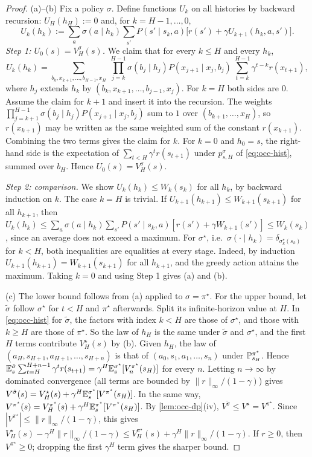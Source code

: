 \begin{proof}
(a)--(b) Fix a policy $\sigma$. Define functions $U_k$ on all histories by backward recursion: $U_H(h_H):=0$ and, for $k=H-1,\dots,0$,
\[
U_k(h_k):=\sum_a\sigma(a\mid h_k)\sum_{s'}P(s'\mid s_k,a)\big[r(s')+\gamma U_{k+1}(h_k,a,s')\big].
\]
\emph{Step 1: $U_0(s)=V^\sigma_H(s)$.} We claim that for every $k\le H$ and every $h_k$,
\[
U_k(h_k)=\sum_{b_k,x_{k+1},\dots,b_{H-1},x_H}\ \prod_{j=k}^{H-1}\sigma(b_j\mid h_j)P(x_{j+1}\mid x_j,b_j)\ \sum_{t=k}^{H-1}\gamma^{t-k}r(x_{t+1}),
\]
where $h_j$ extends $h_k$ by $(b_k,x_{k+1},\dots,b_{j-1},x_j)$.
For $k=H$ both sides are $0$.
Assume the claim for $k+1$ and insert it into the recursion.
The weights $\prod_{j=k+1}^{H-1}\sigma(b_j\mid h_j)P(x_{j+1}\mid x_j,b_j)$ sum to $1$ over $(b_{k+1},\dots,x_H)$, so $r(x_{k+1})$ may be written as the same weighted sum of the constant $r(x_{k+1})$.
Combining the two terms gives the claim for $k$.
For $k=0$ and $h_0=s$, the right-hand side is the expectation of $\sum_{t<H}\gamma^tr(s_{t+1})$ under $p^\sigma_{s,H}$ of \eqref{eq:occ-hist}, summed over $b_H$.
Hence $U_0(s)=V^\sigma_H(s)$.

\emph{Step 2: comparison.} We show $U_k(h_k)\le W_k(s_k)$ for all $h_k$, by backward induction on $k$.
The case $k=H$ is trivial.
If $U_{k+1}(h_{k+1})\le W_{k+1}(s_{k+1})$ for all $h_{k+1}$, then
$U_k(h_k)\le\sum_a\sigma(a\mid h_k)\sum_{s'}P(s'\mid s_k,a)[r(s')+\gamma W_{k+1}(s')]\le W_k(s_k)$,
since an average does not exceed a maximum.
For $\sigma^\star$, i.e.\ $\sigma(\cdot\mid h_k)=\delta_{\sigma^\star_k(s_k)}$ for $k<H$, both inequalities are equalities at every stage.
Indeed, by induction $U_{k+1}(h_{k+1})=W_{k+1}(s_{k+1})$ for all $h_{k+1}$, and the greedy action attains the maximum.
Taking $k=0$ and using Step 1 gives (a) and (b).

(c) The lower bound follows from (a) applied to $\sigma=\pi^\star$.
For the upper bound, let $\tilde\sigma$ follow $\sigma^\star$ for $t<H$ and $\pi^\star$ afterwards.
Split its infinite-horizon value at $H$.
In \eqref{eq:occ-hist} for $\tilde\sigma$, the factors with index $k<H$ are those of $\sigma^\star$, and those with $k\ge H$ are those of $\pi^\star$.
So the law of $h_H$ is the same under $\tilde\sigma$ and $\sigma^\star$, and the first $H$ terms contribute $V^\star_H(s)$ by (b).
Given $h_H$, the law of $(a_H,s_{H+1},a_{H+1},\dots,s_{H+n})$ is that of $(a_0,s_1,a_1,\dots,s_n)$ under $\mathbb{P}^{\pi^\star}_{s_H}$.
Hence $\mathbb{E}^{\tilde\sigma}_s\sum_{t=H}^{H+n-1}\gamma^tr(s_{t+1})=\gamma^H\mathbb{E}^{\sigma^\star}_s[V^{\pi^\star}_n(s_H)]$ for every $n$.
Letting $n\to\infty$ by dominated convergence (all terms are bounded by $\|r\|_\infty/(1-\gamma)$) gives
$V^{\tilde\sigma}(s)=V^\star_H(s)+\gamma^H\mathbb{E}^{\sigma^\star}_s[V^{\pi^\star}(s_H)]$.
In the same way, $V^{\pi^\star}(s)=V^{\pi^\star}_H(s)+\gamma^H\mathbb{E}^{\pi^\star}_s[V^{\pi^\star}(s_H)]$.
By \cref{lem:occ-dp}(iv), $V^{\tilde\sigma}\le V^\star=V^{\pi^\star}$.
Since $|V^{\pi^\star}|\le\|r\|_\infty/(1-\gamma)$, this gives
$V^\star_H(s)-\gamma^H\|r\|_\infty/(1-\gamma)\le V^{\pi^\star}_H(s)+\gamma^H\|r\|_\infty/(1-\gamma)$.
If $r\ge0$, then $V^{\pi^\star}\ge0$; dropping the first $\gamma^H$ term gives the sharper bound.
\end{proof}

